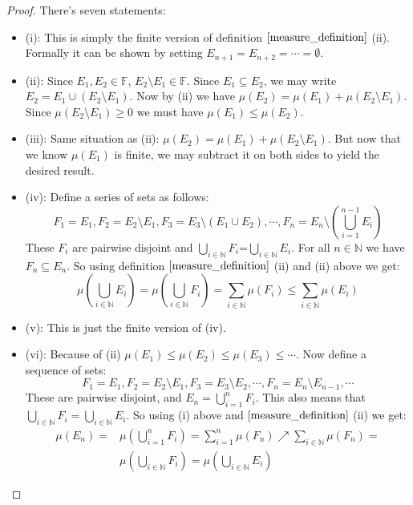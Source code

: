 \documentclass[12pt, a4paper]{article}
\numberwithin{equation}{section}
\begin{document}
\begin{proof}
There's seven statements:
\begin{itemize}
\item (i): This is simply the finite version of definition $\ref{measure_definition}$ (ii). Formally it can be shown by setting $E_{n+1}=E_{n+2}=\cdots=\emptyset$.
\item (ii): Since $E_1,E_2\in\mathbb{F}$, $E_2\setminus E_1\in\mathbb{F}$. Since $E_1\subseteq E_2$, we may write $E_2=E_1\cup(E_2\setminus E_1)$. Now by (ii) we have $\mu(E_2)=\mu(E_1)+\mu(E_2\setminus E_1)$. Since $\mu(E_2\setminus E_1)\ge 0$ we must have $\mu(E_1)\le\mu(E_2)$.
\item (iii): Same situation as (ii): $\mu(E_2)=\mu(E_1)+\mu(E_2\setminus E_1)$. But now that we know $\mu(E_1)$ is finite, we may subtract it on both sides to yield the desired result.
\item (iv): Define a series of sets as follows:
\begin{equation}
F_1=E_1, F_2=E_2\setminus E_1, F_3=E_3\setminus(E_1\cup E_2),\cdots,F_n=E_n\setminus\left(\bigcup_{i=1}^{n-1}E_i\right)
\end{equation}
These $F_i$ are pairwise disjoint and $\bigcup_{i\in\mathbb{N}}F_i$=$\bigcup_{i\in\mathbb{N}}E_i$. For all $n\in\mathbb{N}$ we have $F_n\subseteq E_n$. So using definition $\ref{measure_definition}$ (ii) and (ii) above we get:
\begin{equation}
\mu\left(\bigcup_{i\in\mathbb{N}}E_i\right)=\mu\left(\bigcup_{i\in\mathbb{N}}F_i\right)=\sum_{i\in\mathbb{N}}\mu(F_i)\le\sum_{i\in\mathbb{N}}\mu(E_i)
\end{equation}
\item (v): This is just the finite version of (iv).
\item (vi): Because of (ii) $\mu(E_1)\le\mu(E_2)\le\mu(E_3)\le\cdots$. Now define a sequence of sets:
\begin{equation}
F_1=E_1, F_2=E_2\setminus E_1, F_3=E_3\setminus E_2, \cdots, F_n=E_n\setminus E_{n-1},\cdots
\end{equation}
These are pairwise disjoint, and $E_n=\bigcup_{i=1}^n F_i$. This also means that $\bigcup_{i\in\mathbb{N}}F_i=\bigcup_{i\in\mathbb{N}}E_i$. So using (i) above and $\ref{measure_definition}$ (ii) we get:
\begin{align}
\mu(E_n)=&\mu\left(\bigcup_{i=1}^n F_i\right)=\sum_{i=1}^n\mu(F_n)\nearrow\sum_{i\in\mathbb{N}}\mu(F_n)=\\
&\mu\left(\bigcup_{i\in\mathbb{N}}F_i\right)=\mu\left(\bigcup_{i\in\mathbb{N}}E_i\right)

\end{align}
\end{itemize}
\end{proof}
\end{document}
